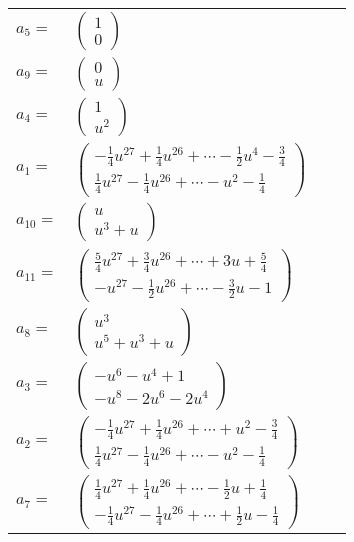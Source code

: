 \documentclass[1p]{elsarticle_modified}
\theoremstyle{definition}
\begin{document}
\begin{tabular}{m{7pt} m{180pt} m{7pt} m{180pt} }
\flushright $a_{5}=$&$\begin{pmatrix}1\\0\end{pmatrix}$ \\
\flushright $a_{9}=$&$\begin{pmatrix}0\\u\end{pmatrix}$ \\
\flushright $a_{4}=$&$\begin{pmatrix}1\\u^2\end{pmatrix}$ \\
\flushright $a_{1}=$&$\begin{pmatrix}-\frac{1}{4} u^{27}+\frac{1}{4} u^{26}+\cdots-\frac{1}{2} u^4-\frac{3}{4}\\\frac{1}{4} u^{27}-\frac{1}{4} u^{26}+\cdots- u^2-\frac{1}{4}\end{pmatrix}$ \\
\flushright $a_{10}=$&$\begin{pmatrix}u\\u^3+u\end{pmatrix}$ \\
\flushright $a_{11}=$&$\begin{pmatrix}\frac{5}{4} u^{27}+\frac{3}{4} u^{26}+\cdots+3 u+\frac{5}{4}\\- u^{27}-\frac{1}{2} u^{26}+\cdots-\frac{3}{2} u-1\end{pmatrix}$ \\
\flushright $a_{8}=$&$\begin{pmatrix}u^3\\u^5+u^3+u\end{pmatrix}$ \\
\flushright $a_{3}=$&$\begin{pmatrix}- u^6- u^4+1\\- u^8-2 u^6-2 u^4\end{pmatrix}$ \\
\flushright $a_{2}=$&$\begin{pmatrix}-\frac{1}{4} u^{27}+\frac{1}{4} u^{26}+\cdots+u^2-\frac{3}{4}\\\frac{1}{4} u^{27}-\frac{1}{4} u^{26}+\cdots- u^2-\frac{1}{4}\end{pmatrix}$ \\
\flushright $a_{7}=$&$\begin{pmatrix}\frac{1}{4} u^{27}+\frac{1}{4} u^{26}+\cdots-\frac{1}{2} u+\frac{1}{4}\\-\frac{1}{4} u^{27}-\frac{1}{4} u^{26}+\cdots+\frac{1}{2} u-\frac{1}{4}\end{pmatrix}$ \\

\end{tabular}
\end{document}
